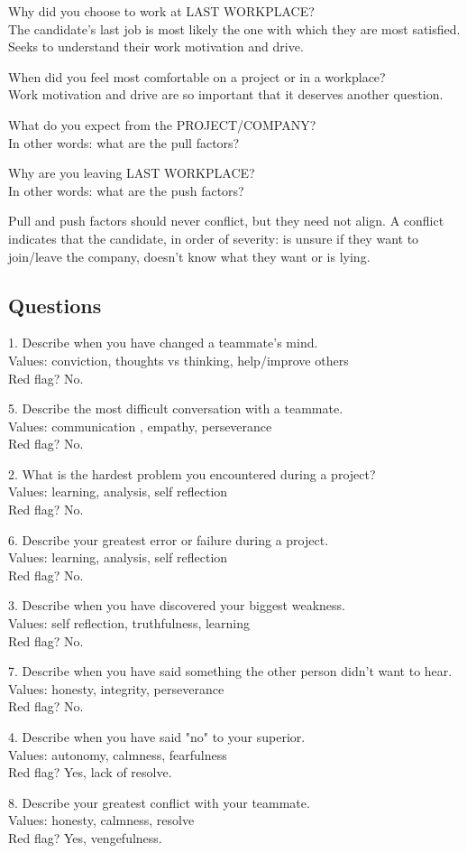 \documentclass{article}
\newcommand{\questionanswer}
[3]
{
#1 \\
Values: #2 \\
Red flag? #3
}
\begin{document}
Why did you choose to work at LAST WORKPLACE? \\
The candidate's last job is most likely the one with which they are most satisfied. \\
Seeks to understand their work motivation and drive.

When did you feel most comfortable on a project or in a workplace? \\
Work motivation and drive are so important that it deserves another question.

What do you expect from the PROJECT/COMPANY? \\
In other words: what are the pull factors?

Why are you leaving LAST WORKPLACE? \\
In other words: what are the push factors?

Pull and push factors should never conflict, but they need not align.
A conflict indicates that the candidate, in order of severity: is unsure if they want to join/leave the company, doesn't know what they want or is lying.


\subsection{Questions}

\questionanswer{1. Describe when you have changed a teammate's mind.}{conviction, thoughts vs thinking, help/improve others}{No.}

\questionanswer{5. Describe the most difficult conversation with a teammate.}{communication , empathy, perseverance}{No.}

\questionanswer{2. What is the hardest problem you encountered during a project?}{learning, analysis, self reflection}{No.}

\questionanswer{6. Describe your greatest error or failure during a project.}{learning, analysis, self reflection}{No.}

\questionanswer{3. Describe when you have discovered your biggest weakness.}{self reflection, truthfulness, learning}{No.}

\questionanswer{7. Describe when you have said something the other person didn't want to hear.}{honesty, integrity, perseverance}{No.}

\questionanswer{4. Describe when you have said "no" to your superior.}{autonomy, calmness, fearfulness}{Yes, lack of resolve.}

\questionanswer{8. Describe your greatest conflict with your teammate.}{honesty, calmness, resolve}{Yes, vengefulness.}
\end{document}
